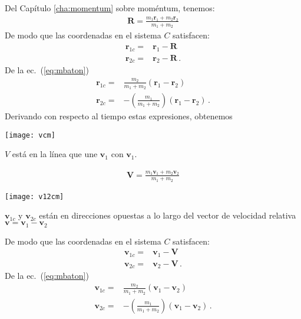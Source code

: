Del Capítulo \ref{cha:momentum} sobre moméntum, tenemos:
  \begin{align}
    \label{eq:mbaton}
    \mathbf{R}=\frac{m_1\mathbf{r}_1+m_2\mathbf{r}_2}{m_1+m_2}
  \end{align}
De modo que las coordenadas en el sistema $C$ satisfacen:
\begin{align}
  \mathbf{r}_{1c} =&\mathbf{r}_1-\mathbf{R}\nonumber\\
  \mathbf{r}_{2c}=&\mathbf{r}_2-\mathbf{R}\,.
\end{align}
De la ec.~(\ref{eq:mbaton})
\begin{align}
  \mathbf{r}_{1c}
    =&\frac{m_2}{m_1+m_2}(\mathbf{r}_1-\mathbf{r}_2)\nonumber\\
 \mathbf{r}_{2c}=&-\left(\frac{m_1}{m_1+m_2} \right)\left(\mathbf{r}_1-\mathbf{r}_2 \right)\,.
\end{align}
Derivando con respecto al tiempo estas expresiones, obtenemos
 
\begin{minipage}{0.5\linewidth}
  \texttt{[image: vcm]}

\noindent
$V$ está en la línea que une $\mathbf{v}_1$ con $\mathbf{v}_1$.
\end{minipage}
\begin{minipage}{0.5\linewidth}
  \begin{align}
    \label{eq:Vcm}
    \mathbf{V}=\frac{m_1\mathbf{v}_1+m_2\mathbf{v}_2}{m_1+m_2}
  \end{align}
\end{minipage}


\begin{minipage}{0.5\linewidth}
  \texttt{[image: v12cm]}

\noindent
$\mathbf{v}_{1c}$ y $\mathbf{v}_{2c}$ están en direcciones opuestas a lo largo del vector de velocidad relativa $\mathbf{v}=\mathbf{v}_1-\mathbf{v}_2$
\end{minipage}
\begin{minipage}{0.5\linewidth}
De modo que las coordenadas en el sistema $C$ satisfacen:
\begin{align}
  \label{eq:v12cm}
  \mathbf{v}_{1c} =&\mathbf{v}_1-\mathbf{V}\nonumber\\
  \mathbf{v}_{2c}=&\mathbf{v}_2-\mathbf{V}\,.
\end{align}
De la ec.~(\ref{eq:mbaton})
\begin{align}
  \label{eq:v12cm12}
  \mathbf{v}_{1c}
    =&\frac{m_2}{m_1+m_2}(\mathbf{v}_1-\mathbf{v}_2)\nonumber\\
 \mathbf{v}_{2c}=&-\left(\frac{m_1}{m_1+m_2} \right)\left(\mathbf{v}_1-\mathbf{v}_2 \right)\,.
\end{align}
\end{minipage}
  
